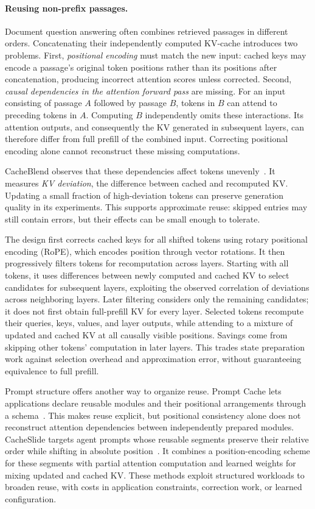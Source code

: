 \paragraph{Reusing non-prefix passages.}
Document question answering often combines retrieved passages in different orders. Concatenating their independently computed KV-cache introduces two problems. First, \emph{positional encoding} must match the new input: cached keys may encode a passage's original token positions rather than its positions after concatenation, producing incorrect attention scores unless corrected. Second, \emph{causal dependencies in the attention forward pass} are missing. For an input consisting of passage $A$ followed by passage $B$, tokens in $B$ can attend to preceding tokens in $A$. Computing $B$ independently omits these interactions. Its attention outputs, and consequently the KV generated in subsequent layers, can therefore differ from full prefill of the combined input. Correcting positional encoding alone cannot reconstruct these missing computations.

CacheBlend observes that these dependencies affect tokens unevenly~\cite{kv_yao2025cacheblend}. It measures \emph{KV deviation}, the difference between cached and recomputed KV. Updating a small fraction of high-deviation tokens can preserve generation quality in its experiments. This supports approximate reuse: skipped entries may still contain errors, but their effects can be small enough to tolerate.

The design first corrects cached keys for all shifted tokens using rotary positional encoding (RoPE), which encodes position through vector rotations. It then progressively filters tokens for recomputation across layers. Starting with all tokens, it uses differences between newly computed and cached KV to select candidates for subsequent layers, exploiting the observed correlation of deviations across neighboring layers. Later filtering considers only the remaining candidates; it does not first obtain full-prefill KV for every layer. Selected tokens recompute their queries, keys, values, and layer outputs, while attending to a mixture of updated and cached KV at all causally visible positions. Savings come from skipping other tokens' computation in later layers. This trades state preparation work against selection overhead and approximation error, without guaranteeing equivalence to full prefill.

Prompt structure offers another way to organize reuse. Prompt Cache lets applications declare reusable modules and their positional arrangements through a schema~\cite{kv_gim2024promptcache}. This makes reuse explicit, but positional consistency alone does not reconstruct attention dependencies between independently prepared modules. CacheSlide targets agent prompts whose reusable segments preserve their relative order while shifting in absolute position~\cite{kv_liu2026cacheslide}. It combines a position-encoding scheme for these segments with partial attention computation and learned weights for mixing updated and cached KV. These methods exploit structured workloads to broaden reuse, with costs in application constraints, correction work, or learned configuration.

